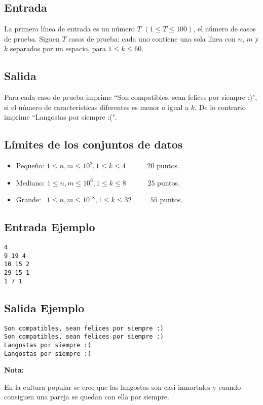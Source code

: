\subsection*{Entrada}

La primera línea de entrada es un número $T$ $(1 \leq T \leq 100)$, el número de casos de prueba. Siguen $T$ casos de prueba: cada uno contiene una sola línea con $n$, $m$ y $k$ separados por un espacio, para $1 \leq k \leq 60$. 


\subsection*{Salida}

Para cada caso de prueba imprime ``Son compatibles, sean felices por siempre :)", si el número de características diferentes es menor o igual a $k$. 
De lo contrario imprime ``Langostas por siempre :(".

\subsection*{Límites de los conjuntos de datos}
\begin{itemize}
    \item Pequeño: $ 1 \leq n, m \leq 10^2 , 1 \leq k \leq 4 $   $\quad \;\;\;\;\;$ $20$ puntos.
    \item Mediano: $ 1 \leq n, m \leq 10^6 , 1 \leq k \leq 8 $  $\quad \;\;\;\;\;$ $25$ puntos.
    \item Grande:  $ \;\, 1 \leq n, m \leq 10^{18}, 1 \leq k \leq 32 $ $\quad \quad$ $55$ puntos.
\end{itemize}

\begin{multicols}{2}
\subsection*{Entrada Ejemplo}
\begin{verbatim}
4
9 19 4
10 15 2
29 15 1
1 7 1   

\end{verbatim}
\columnbreak
\subsection*{Salida Ejemplo}
\begin{verbatim}
Son compatibles, sean felices por siempre :)
Son compatibles, sean felices por siempre :)
Langostas por siempre :(
Langostas por siempre :(
\end{verbatim}
\end{multicols}

\textbf{Nota:}

En la cultura popular se cree que las langostas son casi inmortales y cuando consiguen una pareja se quedan con ella por siempre.

